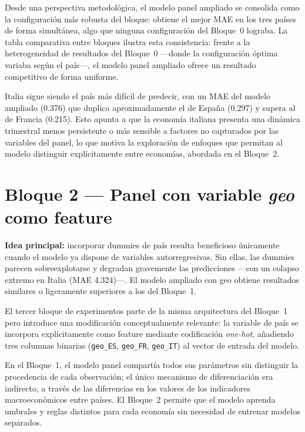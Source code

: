 Desde una perspectiva metodológica, el modelo panel ampliado se consolida como la configuración más robusta del bloque: obtiene el mejor MAE en los tres países de forma simultánea, algo que ninguna configuración del Bloque~0 lograba. La tabla comparativa entre bloques ilustra esta consistencia: frente a la heterogeneidad de resultados del Bloque~0 ---donde la configuración óptima variaba según el país---, el modelo panel ampliado ofrece un resultado competitivo de forma uniforme.

Italia sigue siendo el país más difícil de predecir, con un MAE del modelo ampliado (0.376) que duplica aproximadamente el de España (0.297) y supera al de Francia (0.215). Esto apunta a que la economía italiana presenta una dinámica trimestral menos persistente o más sensible a factores no capturados por las variables del panel, lo que motiva la exploración de enfoques que permitan al modelo distinguir explícitamente entre economías, abordada en el Bloque~2.

\FloatBarrier
\section{Bloque 2 --- Panel con variable \emph{geo} como feature}

\textbf{Idea principal:} incorporar dummies de país resulta beneficioso únicamente cuando el modelo ya dispone de variables autorregresivas. Sin ellas, las dummies parecen sobreexplotarse y degradan gravemente las predicciones ---con un colapso extremo en Italia (MAE 4.324)---. El modelo ampliado con geo obtiene resultados similares o ligeramente superiores a los del Bloque~1.

El tercer bloque de experimentos parte de la misma arquitectura del Bloque~1 pero introduce
una modificación conceptualmente relevante: la variable de país se incorpora explícitamente
como feature mediante codificación \emph{one-hot}, añadiendo tres columnas binarias
(\texttt{geo\_ES}, \texttt{geo\_FR}, \texttt{geo\_IT}) al vector de entrada del modelo.

En el Bloque~1, el modelo panel compartía todos sus parámetros sin distinguir la procedencia
de cada observación; el único mecanismo de diferenciación era indirecto, a través de las
diferencias en los valores de los indicadores macroeconómicos entre países. El Bloque~2
permite que el modelo aprenda umbrales y reglas distintos para cada economía sin necesidad
de entrenar modelos separados.

